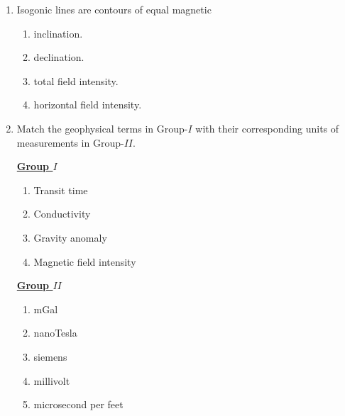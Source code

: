 \documentclass[journal,12pt,onecolumn]{IEEEtran}
\theoremstyle{remark}
\begin{document}
\begin{enumerate}
    \item Isogonic lines are contours of equal magnetic \hfill{}
        \begin{enumerate} 
            \item inclination.
            \item declination.
            \item total field intensity.
            \item horizontal field intensity.
        \end{enumerate}
    \newpage
    \item Match the geophysical terms in Group-$I$ with their corresponding units of measurements in Group-$II$. \hfill{}
        \begin{multicols}{2}
            \underline{\textbf{Group $I$}}
            \begin{enumerate}[start=16]
                \item Transit time
                \item Conductivity
                \item Gravity anomaly
                \item Magnetic field intensity
            \end{enumerate}
            
            \columnbreak
            
            \underline{\textbf{Group $II$}}
            \begin{enumerate}
                \item mGal
                \item nanoTesla
                \item siemens
                \item millivolt
                \item microsecond per feet
            \end{enumerate}
        \end{multicols}
        \begin{enumerate} 
        \end{enumerate}
        

\end{enumerate}
\end{document}
